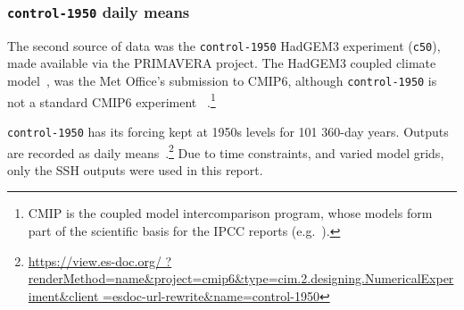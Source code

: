 \subsubsection{\texttt{control-1950} daily means}

\label{sec:control-1950-intro}

The second source of data was the \texttt{control-1950} HadGEM3 experiment (\texttt{c50}),
made available via the PRIMAVERA project.
The HadGEM3 coupled climate model~\cite{williams2018met, FurtherInfo},
 was the Met Office's submission to CMIP6,
although \texttt{control-1950} is not a standard CMIP6 experiment~\cite{eyring2016overview}
.\footnote{CMIP is the coupled model intercomparison program,
whose models form part of the scientific basis for the IPCC
reports (e.g.~\cite{SROCC}).}

\texttt{control-1950} has its forcing kept at
1950s levels for 101 360-day years. Outputs are recorded as daily
means~\cite{williams2018met, FurtherInfo}.\footnote{\url{https://view.es-doc.org/
        ?renderMethod=name&project=cmip6&type=cim.2.designing.NumericalExperiment&client
        =esdoc-url-rewrite&name=control-1950}}
Due to time constraints, and varied model grids, only the SSH outputs were used in this report.
